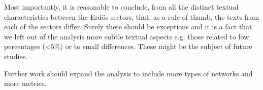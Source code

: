 \documentclass[review]{elsarticle}
\begin{document}
Most importantly, it is reasonable to conclude, from all the distinct textual characteristics
between the Erd\"os sectors, that, as a rule of thumb, the texts from each of the sectors differ.
Surely there should be exceptions and it is a fact that we left out of the analysis
more subtle textual aspects e.g. those related to low percentages (<5\%) or to small
differences.
These might be the subject of future studies.

Further work should expand the analysis to include
more types of networks and more metrics.


\end{document}
